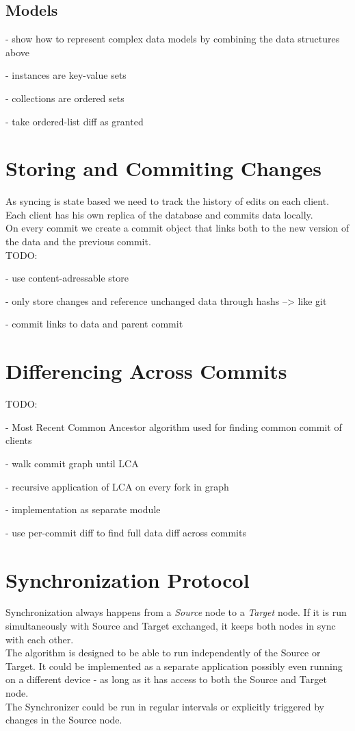 \subsection{Models}
- show how to represent complex data models by combining the data structures above

- instances are key-value sets

- collections are ordered sets

- take ordered-list diff as granted

\section{Storing and Commiting Changes}
\label{main.committing}
As syncing is state based we need to track the history of edits on each client.\\Each client has his own replica of the database and commits
data locally.\\On every commit we create a commit object that links both
to the new version of the data and the previous commit.\\

TODO:

- use content-adressable store

- only store changes and reference unchanged data through hashs --> like git

- commit links to data and parent commit

\section{Differencing Across Commits}
\label{main.diff-across-commits}

TODO:

- Most Recent Common Ancestor algorithm used for finding common commit of clients

- walk commit graph until LCA

- recursive application of LCA on every fork in graph

- implementation as separate module

- use per-commit diff to find full data diff across commits

\section{Synchronization Protocol}
Synchronization always happens from a \emph{Source} node to a \emph{Target} node.
If it is run simultaneously with Source and Target exchanged, it keeps both nodes in sync with each other.\\
The algorithm is designed to be able to run independently of the Source or Target.
It could be implemented as a separate application possibly even running on a different device - as long as it has access to both the Source and Target node.\\
The Synchronizer could be run in regular intervals or explicitly triggered by changes in the Source node.\\

